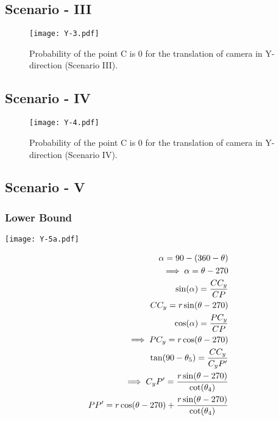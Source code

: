 \subsection{Scenario - III}

\begin{figure}[H]
	\centering
	\texttt{[image: Y-3.pdf]} 
	\caption{Probability of the point C is $0$ for the translation of camera in Y-direction (Scenario III).}
	\label{fig:SWIM-images}
\end{figure}


\subsection{Scenario - IV}

\begin{figure}[H]
	\centering
	\texttt{[image: Y-4.pdf]} 
	\caption{Probability of the point C is $0$ for the translation of camera in Y-direction (Scenario IV).}
	\label{fig:SWIM-images}
\end{figure}


\subsection{Scenario - V}

\subsubsection{Lower Bound}

\begin{minipage}[t]{0.5\textwidth}
\texttt{[image: Y-5a.pdf]}  
\end{minipage}
\begin{minipage}[t]{0.5\textwidth}
\vspace{-2in}
\begin{equation*}
\centering
\begin{aligned}
\alpha = 90 - (360 - \theta)\\
\implies \alpha = \theta - 270 \\
\sin(\alpha) = \frac{CC_y}{CP}\\
CC_y = r\sin(\theta - 270)\\
\cos(\alpha) = \frac{PC_y}{CP}\\
\implies PC_y = r\cos(\theta - 270)\\
\tan(90 - \theta_5) = \frac{CC_y}{C_{y}P'}\\
\implies C_{y}P' = \frac{r\sin(\theta - 270)}{\cot(\theta_4)}\\
PP' = r\cos(\theta - 270) +  \frac{r\sin(\theta - 270)}{\cot(\theta_4)}
\end{aligned}
\end{equation*}
\end{minipage}







